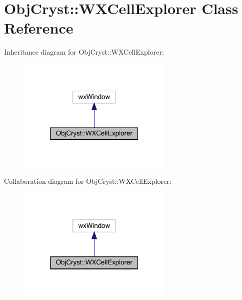 \hypertarget{class_obj_cryst_1_1_w_x_cell_explorer}{}\section{Obj\+Cryst\+::W\+X\+Cell\+Explorer Class Reference}
\label{class_obj_cryst_1_1_w_x_cell_explorer}


Inheritance diagram for Obj\+Cryst\+::W\+X\+Cell\+Explorer\+:
\nopagebreak
\begin{figure}[H]
\begin{center}
\leavevmode
\includegraphics[width=211pt]{class_obj_cryst_1_1_w_x_cell_explorer__inherit__graph}
\end{center}
\end{figure}


Collaboration diagram for Obj\+Cryst\+::W\+X\+Cell\+Explorer\+:
\nopagebreak
\begin{figure}[H]
\begin{center}
\leavevmode
\includegraphics[width=211pt]{class_obj_cryst_1_1_w_x_cell_explorer__coll__graph}
\end{center}
\end{figure}
